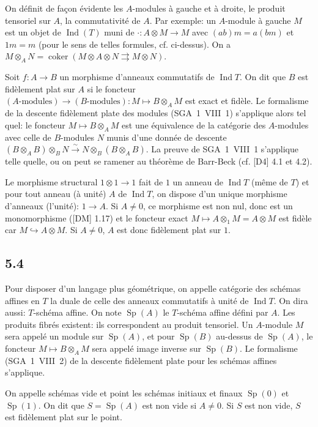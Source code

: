 \documentclass[12pt,a4paper]{article}
\theoremstyle{plain}
\theoremstyle{definition}
\theoremstyle{remark}
\DeclareMathOperator{\Ind}{Ind}
\DeclareMathOperator{\coker}{coker}
\DeclareMathOperator{\Sp}{Sp}
\begin{document}
On définit de façon évidente les $A$-modules à gauche et à droite, le produit tensoriel sur $A$, la commutativité de $A$. Par exemple: un $A$-module à gauche $M$ est un objet de $\Ind(T)$ muni de $\cdot: A 
\otimes M 
\to M$ avec $(ab)m = a(bm)$ et $1m = m$ (pour le sens de telles formules, cf. ci-dessus). On a $M 
\otimes_A N = 
\coker(M 
\otimes A 
\otimes N 
\rightrightarrows M 
\otimes N)$.

Soit $f: A 
\to B$ un morphisme d'anneaux commutatifs de $\Ind T$. On dit que $B$ est fidèlement plat sur $A$ si le foncteur $(A\text{-modules}) 
\to (B\text{-modules}): M 
\mapsto B 
\otimes_A M$ est exact et fidèle. Le formalisme de la descente fidèlement plate des modules (SGA~1~VIII~1) s'applique alors tel quel: le foncteur $M 
\mapsto B 
\otimes_A M$ est une équivalence de la catégorie des $A$-modules avec celle de $B$-modules $N$ munis d'une donnée de descente $(B 
\otimes_A B) 
\otimes_B N 
\xrightarrow{\sim} N 
\otimes_B (B 
\otimes_A B)$. La preuve de SGA~1~VIII~1 s'applique telle quelle, ou on peut se ramener au théorème de Barr-Beck (cf. [D4] 4.1 et 4.2).

Le morphisme structural $1 
\otimes 1 
\to 1$ fait de $1$ un anneau de $\Ind T$ (même de $T$) et pour tout anneau (à unité) $A$ de $\Ind T$, on dispose d'un unique morphisme d'anneaux (l'unité): $1 
\to A$. Si $A 
\neq 0$, ce morphisme est non nul, donc est un monomorphisme ([DM] 1.17) et le foncteur exact $M 
\mapsto A 
\otimes_1 M = A 
\otimes M$ est fidèle car $M 
\hookrightarrow A 
\otimes M$. Si $A 
\neq 0$, $A$ est donc fidèlement plat sur $1$.

\subsection*{5.4}
Pour disposer d'un langage plus géométrique, on appelle catégorie des schémas affines en $T$ la duale de celle des anneaux commutatifs à unité de $\Ind T$. On dira aussi: $T$-schéma affine. On note $\Sp(A)$ le $T$-schéma affine défini par $A$. Les produits fibrés existent: ils correspondent au produit tensoriel. Un $A$-module $M$ sera appelé un module sur $\Sp(A)$, et pour $\Sp(B)$ au-dessus de $\Sp(A)$, le foncteur $M 
\mapsto B 
\otimes_A M$ sera appelé image inverse sur $\Sp(B)$. Le formalisme (SGA~1~VIII~2) de la descente fidèlement plate pour les schémas affines s'applique.

On appelle schémas vide et point les schémas initiaux et finaux $\Sp(0)$ et $\Sp(1)$. On dit que $S = 
\Sp(A)$ est non vide si $A 
\neq 0$. Si $S$ est non vide, $S$ est fidèlement plat sur le point.
\end{document}
